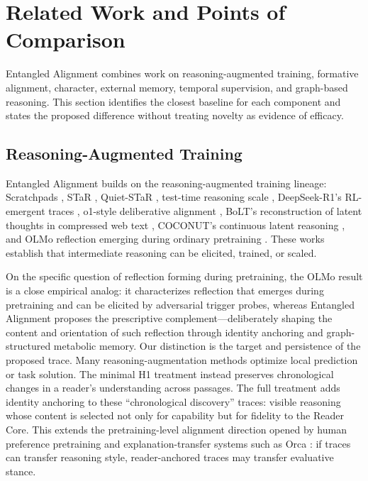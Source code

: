 \section{Related Work and Points of Comparison}\label{sec:related-work}

Entangled Alignment combines work on reasoning-augmented training, formative
alignment, character, external memory, temporal supervision, and graph-based
reasoning. This section identifies the closest baseline for each component and
states the proposed difference without treating novelty as evidence of efficacy.

\subsection{Reasoning-Augmented Training}

Entangled Alignment builds on the reasoning-augmented training lineage:
Scratchpads \cite{nye2021scratchpads}, STaR \cite{zelikman2022star},
Quiet-STaR \cite{zelikman2024quietstar}, test-time reasoning scale
\cite{snell2024scaling}, DeepSeek-R1's RL-emergent traces
\cite{deepseek2025r1}, o1-style deliberative alignment
\cite{openai2024o1, guan2024deliberative}, BoLT's reconstruction of latent
thoughts in compressed web text \cite{ruan2025bolt}, COCONUT's continuous
latent reasoning \cite{hao2024coconut}, and OLMo reflection emerging during
ordinary pretraining \cite{rethinkingreflection2025}. These works establish
that intermediate reasoning can be elicited, trained, or scaled.

On the specific question of reflection forming during pretraining, the OLMo
result is a close empirical analog: it characterizes
reflection that emerges during pretraining and can be elicited by adversarial
trigger probes, whereas Entangled Alignment proposes the prescriptive
complement---deliberately shaping the content and orientation of such
reflection through identity anchoring and graph-structured metabolic memory.
Our distinction is the target and persistence of the proposed trace. Many
reasoning-augmentation methods optimize local prediction or task solution.
The minimal H1 treatment instead preserves chronological changes in a reader's
understanding across passages. The full treatment adds identity anchoring to these ``chronological discovery''
traces: visible reasoning whose content is selected not only for capability but for
fidelity to the Reader Core.
This extends the pretraining-level alignment direction opened by human
preference pretraining \cite{korbak2023pretraining} and explanation-transfer
systems such as Orca \cite{mukherjee2023orca}: if traces can transfer reasoning
style, reader-anchored traces may transfer evaluative stance.

